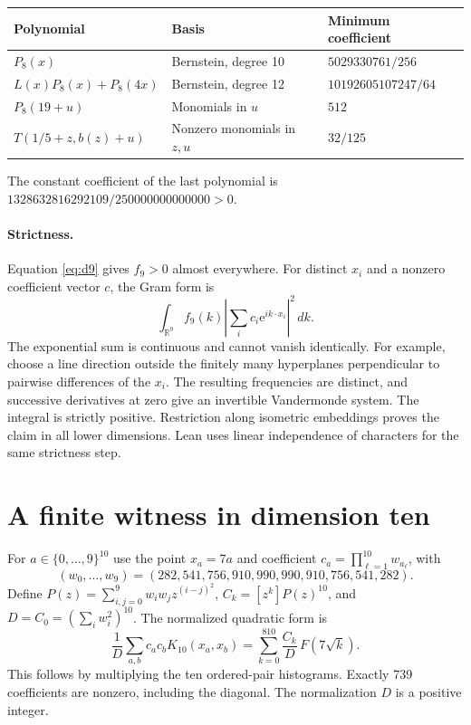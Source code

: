 \documentclass[11pt]{article}
\newcommand{\R}{\mathbb R}
\newcommand{\ee}{\mathrm e}
\begin{document}
\smallskip
\begin{center}
\small
\begin{tabular}{lll}
\toprule
Polynomial & Basis & Minimum coefficient \\
\midrule
$P_8(x)$ & Bernstein, degree 10 & $5029330761/256$ \\
$L(x)P_8(x)+P_8(4x)$ & Bernstein, degree 12 & $10192605107247/64$ \\
$P_8(19+u)$ & Monomials in $u$ & $512$ \\
$T(1/5+z,b(z)+u)$ & Nonzero monomials in $z,u$ & $32/125$ \\
\bottomrule
\end{tabular}
\end{center}
The constant coefficient of the last polynomial is
$1328632816292109/250000000000000>0$.

\paragraph{Strictness.}
Equation \eqref{eq:d9} gives $f_9>0$ almost everywhere. For
distinct $x_i$ and a nonzero coefficient vector $c$, the Gram form is
\[
 \int_{\R^9} f_9(k)
 \left|\sum_i c_i\ee^{ik\cdot x_i}\right|^2\,dk.
\]
The exponential sum is continuous and cannot vanish identically.
For example, choose a line direction outside the finitely many
hyperplanes perpendicular to pairwise differences of the $x_i$.
The resulting frequencies are distinct, and successive derivatives
at zero give an invertible Vandermonde system. The integral is
strictly positive. Restriction along isometric embeddings proves the
claim in all lower dimensions. Lean uses linear independence of
characters for the same strictness step.


\section{A finite witness in dimension ten}\label{sec:witness}
For $a\in\{0,\ldots,9\}^{10}$ use the point $x_a=7a$ and coefficient
$c_a=\prod_{\ell=1}^{10} w_{a_\ell}$, with
\[
 (w_0,\ldots,w_9)=(282,541,756,910,990,990,910,756,541,282).
\]
Define $P(z)=\sum_{i,j=0}^9 w_iw_j z^{(i-j)^2}$, $C_k=[z^k]P(z)^{10}$,
and $D=C_0=(\sum_iw_i^2)^{10}$. The normalized quadratic form is
\[
 \frac1D\sum_{a,b}c_ac_bK_{10}(x_a,x_b)
 =\sum_{k=0}^{810}\frac{C_k}{D}\,F(7\sqrt{k}).
\]
This follows by multiplying the ten ordered-pair histograms. Exactly
739 coefficients are nonzero, including the diagonal. The normalization
$D$ is a positive integer.
\end{document}

